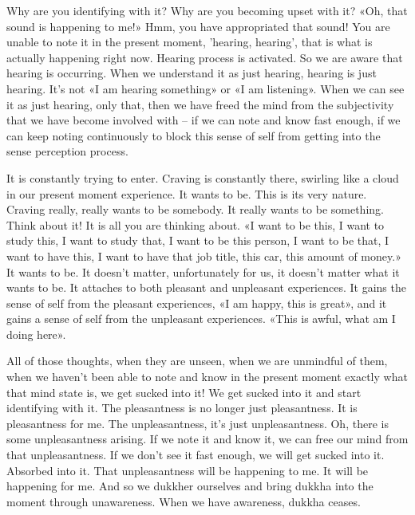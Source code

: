 \documentclass[letterpaper,10pt,english]{sphinxmanual}
\begin{document}
\sphinxAtStartPar
Why  are  you  identifying  with  it? Why  are  you  becoming  upset  with
it? «Oh, that sound is happening to me!» Hmm, you have appropriated that
sound! You are unable to note it in the present moment, ’hearing, hearing’,
that is what is actually happening right now. Hearing process is activated.
So  we  are  aware  that  hearing  is  occurring. When  we  understand  it  as  just
hearing, hearing is just hearing. It’s not «I am hearing something» or «I am
listening». When we can see it as just hearing, only that, then we have freed
  the mind from the subjectivity that we have become involved with – if we
can note and know fast enough, if we can keep noting continuously to block
this sense of self from getting into the sense perception process.

\sphinxAtStartPar
It is constantly trying to enter. Craving is constantly there, swirling like
a cloud in our present moment experience. It wants to be. This is its very
nature.  Craving  really,  really  wants  to  be  somebody.  It  really  wants  to  be
something. Think about it! It is all you are thinking about. «I want to be this,
I want to study this, I want to study that, I want to be this person, I want to
be that, I want to have this, I want to have that job title, this car, this amount
of money.» It wants to be. It doesn’t matter, unfortunately for us, it doesn’t
matter what it wants to be. It attaches to both pleasant and unpleasant experiences. It gains the sense of self from the pleasant experiences, «I am happy,
this is great», and it gains a sense of self from the unpleasant experiences.
«This is awful, what am I doing here».

\sphinxAtStartPar
All of those thoughts, when they are unseen, when we are unmindful
of them, when we haven’t been able to note and know in the present moment
exactly what that mind state is, we get sucked into it! We get sucked into it
and start identifying with it. The pleasantness is no longer just pleasantness.
It is pleasantness for me. The unpleasantness, it’s just unpleasantness. Oh,
there is some unpleasantness arising. If we note it and know it, we can free
our mind from that unpleasantness. If we don’t see it fast enough, we will
get sucked into it. Absorbed into it. That unpleasantness will be happening
to me. It will be happening for me. And so we dukkher ourselves and bring
dukkha  into  the  moment  through  unawareness. When  we  have  awareness,
dukkha ceases.
\end{document}
